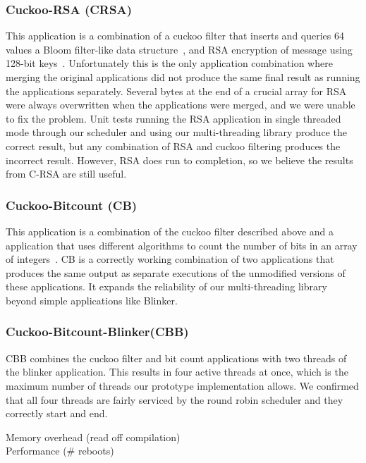 \documentclass[11pt]{sensys-proc}
\begin{document}
\subsubsection{Cuckoo-RSA (CRSA)}
This application is a combination of a cuckoo filter that inserts and queries 64
values a Bloom filter-like data structure~\cite{Chain}, and RSA encryption of message
using 128-bit keys~\cite{Chain}. Unfortunately this is the only application
combination where merging the original applications did not produce the same
final result as running the applications separately. Several bytes at the end of
a crucial array for RSA were always overwritten when the applications were
merged, and we were unable to fix the problem. Unit tests running the RSA
application in single threaded mode through our scheduler and using our
multi-threading library produce the correct result, but any combination of RSA
and cuckoo filtering produces the incorrect result. However, RSA does run to
completion, so we believe the results from C-RSA are still useful.
\subsubsection{Cuckoo-Bitcount (CB)}
This application is a combination of the cuckoo filter described above and a
application that uses different algorithms to count the number of bits in an
array of integers~\cite{bitcount}. CB is a correctly working combination of two
applications that produces the same output as separate executions of the
unmodified versions of these applications. It expands the reliability of our
multi-threading library beyond simple applications like Blinker.
\subsubsection{Cuckoo-Bitcount-Blinker(CBB)}
CBB combines the cuckoo filter and bit count applications with two threads of
the blinker application. This results in four active threads at once, which is
the maximum number of threads our prototype implementation allows. We confirmed
that all four threads are fairly serviced by the round robin scheduler and they
correctly start and end.


Memory overhead (read off compilation)\\
Performance (\# reboots)\\
\end{document}
